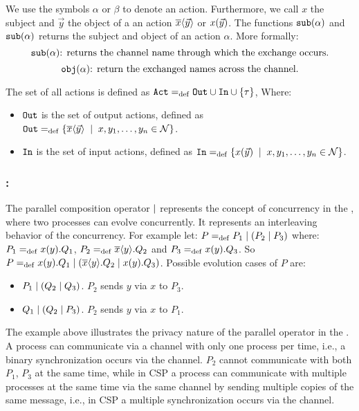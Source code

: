 We use the symbols $\alpha$ or $\beta$ to denote an action. Furthermore, we call $x$ the subject and $\vec{y}$ the object of a an action $\overline{x}\langle\vec{y}\rangle$ or $x(\vec{y})$. The functions  $\mathtt{sub}(\alpha)$ and $\mathtt{sub}(\alpha)$ returns the subject and object of an action $\alpha$. More formally:
\[\mathtt{sub}(\alpha) \text{: returns the channel name through which the exchange occurs.}\]
\[\mathtt{obj}(\alpha) \text{: return the exchanged names across the channel.}\]

The set of all actions is defined as $\actions\define\outA\cup\inA\cup\set{\tau}$, Where:
\begin{itemize}
\item $\mathtt{Out}$ is the set of output actions, defined as $\outA\define\set[x,y_1,\dots,y_n\in\names]{\out{x}{\vec{y}}}$.
\item $\mathtt{In}$ is the set of input actions, defined as $\inA\define\set[x,y_1,\dots,y_n\in\names]{\inp{x}{\vec{y}}}$.
\end{itemize}
\subsubsection{:}
The parallel composition operator $\mid$ represents the concept of concurrency in the \picalc{}, where two processes can evolve concurrently. It represents an interleaving behavior of the concurrency.
For example let:  $P=_{\mathrm{def}}P_1 \mid (P_2 \mid P_3)$ where: $P_1=_{\mathrm{def}}x(y).Q_1$, $P_2=_{\mathrm{def}}\overline{x}\langle y\rangle.Q_2$ and $P_3=_{\mathrm{def}}x(y).Q_3$. So $P=_{\mathrm{def}}x(y).Q_1 \mid (\overline{x}\langle y\rangle.Q_2 \mid x(y).Q_3)$.
Possible evolution cases of $P$ are:
\begin{itemize}
\item $P_1 \mid (Q_2 \mid Q_3)$. $P_2$ sends $y$ via $x$ to $P_3$.
\item $Q_1 \mid (Q_2 \mid P_3)$. $P_2$ sends $y$ via $x$ to $P_1$.
\end{itemize}

The example above illustrates the privacy nature of the parallel operator in the \picalc{}. A process can communicate via a channel with only one process per time, i.e., a binary synchronization occurs via the channel. $P_2$ cannot communicate with both $P_1$, $P_3$ at the same time, while in \gls{CSP} a process can communicate with multiple processes at the same time via the same channel by sending multiple copies of the same message, i.e., in CSP a multiple synchronization occurs via the channel.


